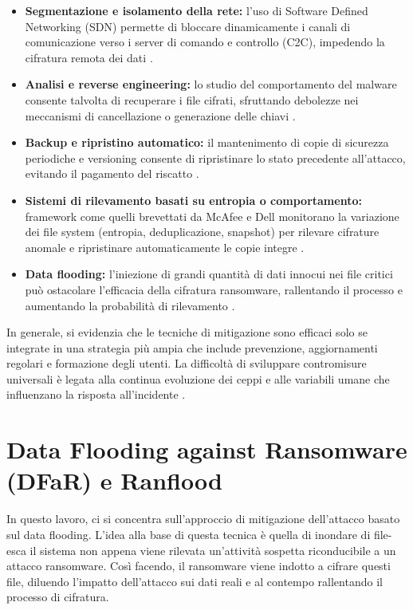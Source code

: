 \documentclass{report}
\begin{document}
\begin{itemize}
    \item \textbf{Segmentazione e isolamento della rete:} l’uso di Software Defined Networking (SDN) permette di bloccare dinamicamente i canali di comunicazione verso i server di comando e controllo (C2C), impedendo la cifratura remota dei dati \cite{cabaj2016sdn}.
    \item \textbf{Analisi e reverse engineering:} lo studio del comportamento del malware consente talvolta di recuperare i file cifrati, sfruttando debolezze nei meccanismi di cancellazione o generazione delle chiavi \cite{zimba2018data}.
    \item \textbf{Backup e ripristino automatico:} il mantenimento di copie di sicurezza periodiche e versioning consente di ripristinare lo stato precedente all’attacco, evitando il pagamento del riscatto \cite{baykara2018safezone}.
    \item \textbf{Sistemi di rilevamento basati su entropia o comportamento:} framework come quelli brevettati da McAfee e Dell monitorano la variazione dei file system (entropia, deduplicazione, snapshot) per rilevare cifrature anomale e ripristinare automaticamente le copie integre \cite{davies2022entropy}.
    \item \textbf{Data flooding:} l’iniezione di grandi quantità di dati innocui nei file critici può ostacolare l’efficacia della cifratura ransomware, rallentando il processo e aumentando la probabilità di rilevamento \cite{berardi2023dataflooding}.
\end{itemize}

In generale, si evidenzia che le tecniche di mitigazione sono efficaci solo se integrate in una strategia
più ampia che include prevenzione, aggiornamenti regolari e formazione degli utenti.
La difficoltà di sviluppare contromisure universali è legata alla
continua evoluzione dei ceppi e alle variabili umane che influenzano la risposta all’incidente \cite{kapoor2021review}.




\section{Data Flooding against Ransomware (DFaR) e Ranflood}
In questo lavoro, ci si concentra sull’approccio di mitigazione dell'attacco basato sul data flooding. 
L'idea alla base di questa tecnica è quella di inondare di file-esca il sistema non appena viene rilevata
un'attività sospetta riconducibile a un attacco ransomware. Così facendo, il ransomware viene indotto a
cifrare questi file, diluendo l'impatto dell'attacco sui dati reali e al contempo
rallentando il processo di cifratura.
\end{document}
